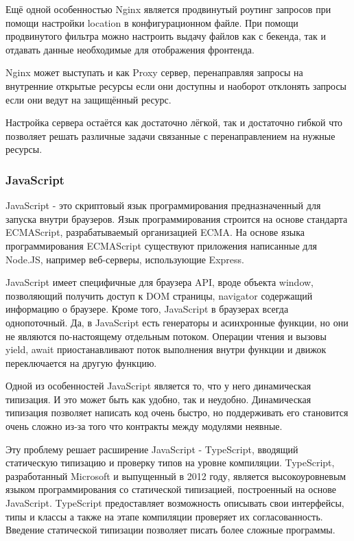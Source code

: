 \documentclass[14pt]{extarticle}
\begin{document}
Ещё одной особенностью Nginx является продвинутый роутинг запросов при помощи настройки location в конфигурационном
файле. При помощи продвинутого фильтра можно настроить выдачу файлов как с бекенда, так и отдавать данные
необходимые для отображения фронтенда.

Nginx может выступать и как Proxy сервер, перенаправляя запросы на внутренние открытые ресурсы если они доступны
и наоборот отклонять запросы если они ведут на защищённый ресурс.

Настройка сервера остаётся как достаточно лёгкой, так и достаточно гибкой что позволяет решать различные задачи
связанные с перенаправлением на нужные ресурсы.

\subsubsection{JavaScript}

JavaScript - это скриптовый язык программирования предназначенный для запуска внутри браузеров. Язык программирования
строится на основе стандарта ECMAScript, разрабатываемый организацией ECMA. На основе языка программирования
ECMAScript существуют приложения написанные для Node.JS, например веб-серверы, использующие Express. 

JavaScript имеет специфичные для браузера API, вроде объекта window, позволяющий получить доступ к DOM
страницы, navigator содержащий информацию о браузере. Кроме того, 
JavaScript в браузерах всегда однопоточный. Да, в JavaScript есть генераторы и асинхронные функции, но они не являются
по-настоящему отдельным потоком. Операции чтения и вызовы yield, await приостанавливают поток выполнения внутри
функции и движок переключается на другую функцию. 

Одной из особенностей JavaScript является то, что у него динамическая типизация. И это может быть как удобно, так и неудобно. 
Динамическая типизация позволяет написать код очень быстро, но поддерживать его становится очень сложно из-за того что
контракты между модулями неявные.

Эту проблему решает расширение JavaScript - TypeScript, вводящий статическую типизацию и проверку типов на уровне 
компиляции. TypeScript, разработанный Microsoft и выпущенный в 2012 году, является высокоуровневым языком программирования
со статической типизацией, построенный на основе JavaScript. TypeScript предоставляет возможность описывать свои
интерфейсы, типы и классы а также на этапе компиляции проверяет их согласованность. Введение статической типизации позволяет писать более сложные 
программы.
\end{document}
